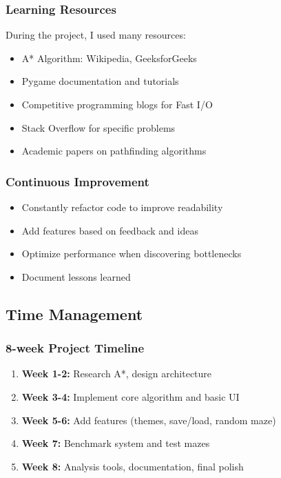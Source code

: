 \documentclass[12pt,a4paper]{article}
\begin{document}
\subsubsection{Learning Resources}
During the project, I used many resources:
\begin{itemize}
    \item A* Algorithm: Wikipedia, GeeksforGeeks
    \item Pygame documentation and tutorials
    \item Competitive programming blogs for Fast I/O
    \item Stack Overflow for specific problems
    \item Academic papers on pathfinding algorithms
\end{itemize}

\subsubsection{Continuous Improvement}
\begin{itemize}
    \item Constantly refactor code to improve readability
    \item Add features based on feedback and ideas
    \item Optimize performance when discovering bottlenecks
    \item Document lessons learned
\end{itemize}

\subsection{Time Management}

\subsubsection{8-week Project Timeline}
\begin{enumerate}
    \item \textbf{Week 1-2:} Research A*, design architecture
    \item \textbf{Week 3-4:} Implement core algorithm and basic UI
    \item \textbf{Week 5-6:} Add features (themes, save/load, random maze)
    \item \textbf{Week 7:} Benchmark system and test mazes
    \item \textbf{Week 8:} Analysis tools, documentation, final polish
\end{enumerate}
\end{document}
